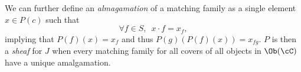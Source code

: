 \begin{frame}
We can further define an {\it almagamation} of a matching family as a single element $x \in P(c)$ such that
$$
\forall f \in S, \,\,\, x \cdot f = x_f,
$$
implying that $P(f)(x)=x_f$ and thus $P(g)(P(f)(x))=x_{fg}$. $P$ is then a {\it sheaf} for $J$ when every matching family for all covers of all objects in $\Ob(\cC)$ have a unique amalgamation. 
\end{frame}